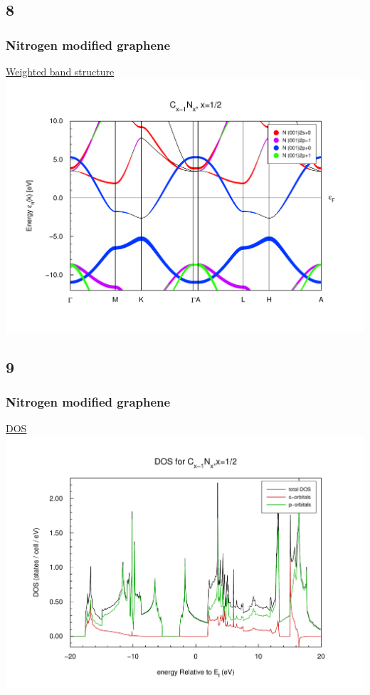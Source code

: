\documentclass{beamer}
\begin{document}
	\subsection*{8}
		\begin{frame}
			\frametitle{Nitrogen modified graphene}
			\underline{Weighted band structure}
			\includegraphics[width=\textwidth]{figures/Nitrogen1R/bweights.pdf}
		\end{frame}

	\subsection*{9}
		\begin{frame}
			\frametitle{Nitrogen modified graphene}
			\underline{DOS}
			\includegraphics[width=\textwidth]{figures/Nitrogen1R/dos.pdf}
		\end{frame}
		
\end{document}
